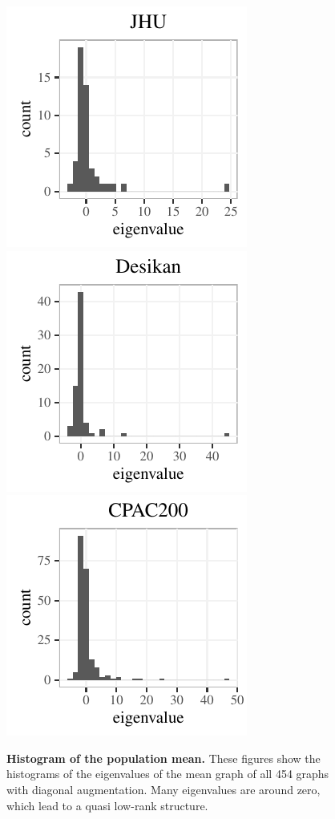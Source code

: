 \documentclass[10pt,letterpaper]{article}
\begin{document}
\begin{figure}[!htbp]
\centering
\includegraphics[height=.2\textheight]{hist_JHU.pdf} 
\includegraphics[height=.2\textheight]{hist_desikan.pdf} 
\includegraphics[height=.2\textheight]{hist_CPAC200.pdf}
\caption{{\bf Histogram of the population mean.}
These figures show the histograms of the eigenvalues of the mean graph of all 454 graphs with diagonal augmentation. Many eigenvalues are around zero, which lead to a quasi low-rank structure.
}
\label{fig:histogram}
\end{figure}
\end{document}
